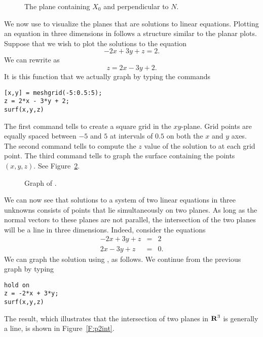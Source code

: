 \documentclass{ximera}
\begin{document}
\begin{figure}[htb]
              \centerline{%
              }
              \caption{The plane containing $X_0$ and perpendicular to $N$.}
              \label{F:plane}
\end{figure}


We now use \Matlab to visualize the planes that are solutions to
linear equations.  Plotting an equation in three dimensions in
\Matlab follows a structure similar to the planar plots.
Suppose that we wish to plot the solutions to the equation
\begin{equation} \label{-2x+3y+z=2}
-2x+3y+z=2.
\end{equation}
We can rewrite  as
\[
z=2x-3y+2.
\]
It is this function that we actually graph by typing the
commands
\begin{verbatim}
[x,y] = meshgrid(-5:0.5:5);
z = 2*x - 3*y + 2;
surf(x,y,z)
\end{verbatim}   
The first command tells \Matlab to create a square grid in the
$xy$-plane.  Grid points are
equally spaced between $-5$ and $5$ at intervals of $0.5$ on
both the $x$ and $y$ axes. The second command tells \Matlab to
compute the $z$ value of the solution to  at
each grid point.  The third command tells \Matlab to graph the
surface containing the points $(x,y,z)$.  See
Figure~\ref{F:p1int}.

\begin{figure}[htb]
              \centerline{%
              }
              \caption{Graph of \protect{}.}
              \label{F:p1int}
\end{figure}


We can now see that solutions to a system of two linear
equations in three unknowns consists of points that lie
simultaneously on two planes.  As long as the normal vectors to
these planes are not parallel, the intersection of the two
planes will be a line in three dimensions.  Indeed, consider the
equations
\begin{eqnarray*}
-2x + 3y + z & = & 2 \\
 2x - 3y + z & = & 0.
\end{eqnarray*}
We can graph the solution using \Matlab, as follows. We continue
from the previous graph by typing
\begin{verbatim}
hold on
z = -2*x + 3*y;
surf(x,y,z)
\end{verbatim}
The result, which illustrates that the intersection of two planes
in $\mbox{$\bf{R}$}^3$ is generally a line, is shown in Figure~\ref{F:p2int}.
\end{document}
